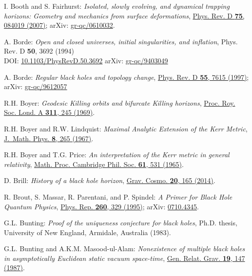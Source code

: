 \begin{thebibliography}{123}
I. Booth and S. Fairhurst:
{\em Isolated, slowly evolving, and dynamical trapping horizons: Geometry and mechanics from surface deformations},
\href{https://doi.org/10.1103/PhysRevD.75.084019}{Phys. Rev. D {\bf 75}, 084019 (2007)};
arXiv: \href{https://arxiv.org/abs/gr-qc/0610032}{gr-qc/0610032}.

A. Borde:
{\em Open and closed universes, initial singularities, and inflation},
Phys. Rev. D {\bf 50}, 3692 (1994)\\
DOI: \href{https://doi.org/10.1103/PhysRevD.50.3692}{10.1103/PhysRevD.50.3692}\hfill
arXiv: \href{https://arxiv.org/abs/gr-qc/9403049}{gr-qc/9403049}

A. Borde:
{\em Regular black holes and topology change},
\href{https://doi.org/10.1103/PhysRevD.55.7615}{Phys. Rev. D {\bf 55}, 7615 (1997)};
arXiv: \href{https://arxiv.org/abs/gr-qc/9612057}{gr-qc/9612057}

R.H. Boyer: {\em Geodesic Killing orbits and bifurcate Killing horizons},
\href{https://doi.org/10.1098/rspa.1969.0116}{Proc. Roy. Soc. Lond. A {\bf 311}, 245 (1969)}.

R.H. Boyer and R.W. Lindquist: {\em Maximal Analytic Extension of the Kerr Metric},
\href{https://doi.org/10.1063/1.1705193}{J.~Math. Phys. {\bf 8}, 265 (1967)}.

R.H. Boyer and T.G. Price: {\em An interpretation of the Kerr metric in general relativity},
\href{https://doi.org/10.1017/S0305004100004096}{Math. Proc. Cambridge Phil. Soc. {\bf 61}, 531 (1965)}.

D. Brill: {\em History of a black hole horizon},
\href{https://doi.org/10.1134/S0202289314030050}{Grav. Cosmo. {\bf 20}, 165 (2014)}.

R. Brout, S. Massar, R. Parentani, and P. Spindel:
{\em A Primer for Black Hole Quantum Physics},
\href{https://doi.org/10.1016/0370-1573(95)00008-5}{Phys. Rep. {\bf 260}, 329 (1995)};
arXiv: \href{https://arxiv.org/abs/0710.4345}{0710.4345}.

G.L. Bunting:
{\em Proof of the uniqueness conjecture for black holes},
Ph.D. thesis, University of New England, Armidale, Australia (1983).

G.L. Bunting and A.K.M. Masood-ul-Alam:
{\em Nonexistence of multiple black holes in asymptotically Euclidean static vacuum space-time},
\href{https://doi.org/10.1007/BF00770326}{Gen. Relat. Grav. {\bf 19}, 147 (1987)}.


\end{thebibliography}
